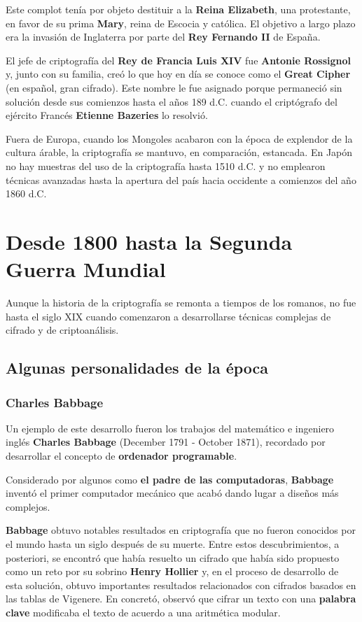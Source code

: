 \documentclass[nochap]{apuntesURJC}
\begin{document}
Este complot tenía por objeto destituir a la \textbf{Reina Elizabeth}, una protestante, en favor de su prima \textbf{Mary}, reina de Escocia y católica. El objetivo a largo plazo era la invasión de Inglaterra por parte del \textbf{Rey Fernando II} de España.

El jefe de criptografía del \textbf{Rey de Francia Luis XIV} fue \textbf{Antonie Rossignol} y, junto con su familia, creó lo que hoy en día se conoce como el \textbf{Great Cipher} (en español, gran cifrado). Este nombre le fue asignado porque permaneció sin solución desde sus comienzos hasta el años 189 d.C. cuando el criptógrafo del ejército Francés \textbf{Etienne Bazeries} lo resolvió.

Fuera de Europa, cuando los Mongoles acabaron con la época de explendor de la cultura árable, la criptografía se mantuvo, en comparación, estancada. En Japón no hay muestras del uso de la criptografía hasta 1510 d.C. y no emplearon técnicas avanzadas hasta la apertura del país hacia occidente a comienzos del año 1860 d.C.

\section{Desde 1800 hasta la Segunda Guerra Mundial}
Aunque la historia de la criptografía se remonta a tiempos de los romanos, no fue hasta el siglo XIX cuando comenzaron a desarrollarse técnicas complejas de cifrado y de criptoanálisis.

\subsection{Algunas personalidades de la época}
\subsubsection{Charles Babbage}
Un ejemplo de este desarrollo fueron los trabajos del matemático e ingeniero inglés \textbf{Charles Babbage} (December 1791 - October 1871), recordado por desarrollar el concepto de \textbf{ordenador programable}.

Considerado por algunos como \textbf{el padre de las computadoras}, \textbf{Babbage} inventó el primer computador mecánico que acabó dando lugar a diseños más complejos.

\textbf{Babbage} obtuvo notables resultados en criptografía que no fueron conocidos por el mundo hasta un siglo después de su muerte. Entre estos descubrimientos, a posteriori, se encontró que había resuelto un cifrado que había sido propuesto como un reto por su sobrino \textbf{Henry Hollier} y, en el proceso de desarrollo de esta solución, obtuvo importantes resultados relacionados con cifrados basados en las tablas de Vigenere. En concretó, observó que cifrar un texto con una \textbf{palabra clave} modificaba el texto de acuerdo a una aritmética modular.
\end{document}
